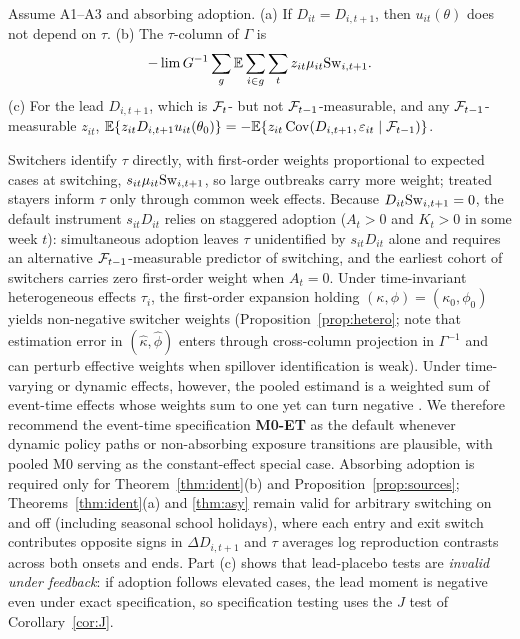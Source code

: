 \begin{proposition}
\label{prop:sources}
Assume A1--A3 and absorbing adoption.
(a) If $D_{it}=D_{i,t+1}$, then $u_{it}(\theta)$ does not depend on $\tau$.
(b) The $\tau$-column of $\Gamma$ is
\begin{equation*}
-\lim G^{-1}\sum_g\mathbb{E}\sum_{i\in g}\sum_t z_{it}\mu_{it}\mathrm{Sw}_{i,t+1}.
\end{equation*}
(c) For the lead $D_{i,t+1}$, which is $\mathcal{F}_t$- but not $\mathcal{F}_{t-1}$-measurable, and any
$\mathcal{F}_{t-1}$-measurable $z_{it}$,
$\mathbb{E}\{z_{it}D_{i,t+1}u_{it}(\theta_0)\}=-\mathbb{E}\{z_{it}\operatorname{Cov}(D_{i,t+1},\varepsilon_{it}\mid\mathcal{F}_{t-1})\}$.
\end{proposition}

Switchers identify $\tau$ directly, with first-order weights proportional to expected cases at
switching, $s_{it}\mu_{it}\mathrm{Sw}_{i,t+1}$, so large outbreaks carry more weight; treated stayers inform
$\tau$ only through common week effects. Because $D_{it}\mathrm{Sw}_{i,t+1}=0$, the default instrument
$s_{it}D_{it}$ relies on staggered adoption ($A_t>0$ and $K_t>0$ in some week $t$): simultaneous
adoption leaves $\tau$ unidentified by $s_{it}D_{it}$ alone and requires an alternative
$\mathcal{F}_{t-1}$-measurable predictor of switching, and the earliest cohort of switchers carries zero
first-order weight when $A_t=0$. Under time-invariant heterogeneous effects $\tau_i$, the first-order
expansion holding $(\kappa,\phi)=(\kappa_0,\phi_0)$ yields non-negative switcher weights
(Proposition~\ref{prop:hetero}; note that estimation error in $(\hat\kappa,\hat\phi)$ enters
through cross-column projection in $\Gamma^{-1}$ and can perturb effective weights when spillover
identification is weak). Under time-varying or dynamic effects, however, the pooled estimand is a
weighted sum of event-time effects whose weights sum to one yet can turn negative
\citep[Web Appendix~\ref{ss:hetero};][]{goodmanbacon2021did,sun2021estimating}. We therefore recommend
the event-time specification \textbf{M0-ET} as the default whenever dynamic policy paths or
non-absorbing exposure transitions are plausible, with pooled M0 serving as the constant-effect
special case. Absorbing adoption is required only for Theorem~\ref{thm:ident}(b) and
Proposition~\ref{prop:sources}; Theorems~\ref{thm:ident}(a) and \ref{thm:asy} remain valid for
arbitrary switching on and off (including seasonal school holidays), where each entry and exit switch
contributes opposite signs in $\Delta D_{i,t+1}$ and $\tau$ averages log reproduction contrasts across
both onsets and ends. Part (c) shows that lead-placebo tests are
\emph{invalid under feedback}: if adoption follows elevated cases, the lead moment is negative even
under exact specification, so specification testing uses the $J$ test of Corollary~\ref{cor:J}.

